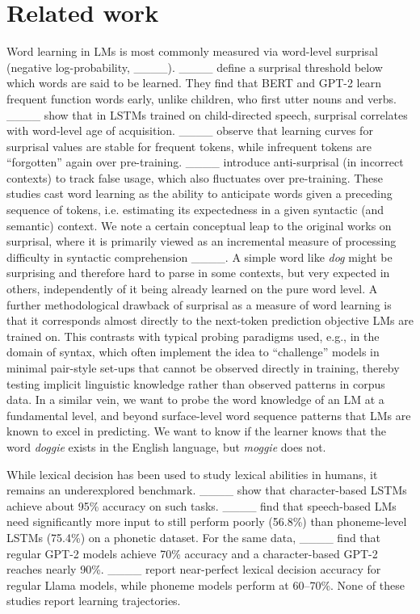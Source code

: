 \section{Related work}
Word learning in LMs is most commonly measured via word-level surprisal (negative log-probability, ____). ____ define a surprisal threshold below which words are said to be learned. They find that BERT and GPT-2 learn frequent function words early, unlike children, who first utter nouns and verbs. ____ show that in LSTMs trained on child-directed speech, surprisal correlates with word-level age of acquisition. ____ observe that learning curves for surprisal values are stable for frequent tokens, while infrequent tokens are ``forgotten'' again over pre-training. ____ introduce anti-surprisal (in incorrect contexts) to track false usage, which also fluctuates over pre-training. These studies cast word learning as the ability to anticipate words given a preceding sequence of tokens, i.e. estimating its expectedness in a given syntactic (and semantic) context. We note a certain conceptual leap to the original works on surprisal, where it is primarily viewed as an incremental measure of processing difficulty in syntactic comprehension ____. A simple word like \textit{dog} might be surprising and therefore hard to parse in some contexts, but very expected in others, independently of it being already learned on the pure word level. A further methodological drawback of surprisal as a measure of word learning is that it corresponds almost directly to the next-token prediction objective LMs are trained on. This contrasts with typical probing paradigms used, e.g., in the domain of syntax, which often implement the idea to ``challenge'' models in minimal pair-style set-ups that cannot be observed directly in training, thereby testing implicit linguistic knowledge rather than observed patterns in corpus data. In a similar vein, we want to probe the word knowledge of an LM at a fundamental level, and beyond surface-level word sequence patterns that LMs are known to excel in predicting. We want to know if the learner knows that the word \textit{doggie} exists in the English language, but \textit{moggie} does not.

While lexical decision has been used to study lexical abilities in humans, it remains an underexplored benchmark. ____ show that character-based LSTMs achieve about 95\% accuracy on such tasks. ____ find that speech-based LMs need significantly more input to still perform poorly (56.8\%) than phoneme-level LSTMs (75.4\%) on a phonetic dataset. For the same data,  ____ find that regular GPT-2 models achieve 70\% accuracy and a character-based GPT-2 reaches nearly 90\%. ____ report near-perfect lexical decision accuracy for regular Llama models, while phoneme models perform at 60--70\%. None of these studies report learning trajectories.